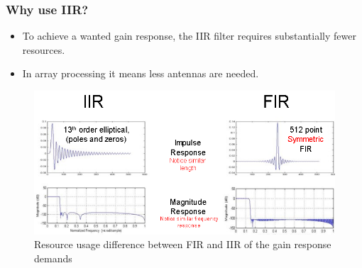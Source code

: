 \documentclass[10pt,pdflatex,headrule,landscape]{beamer}
\begin{document}
\begin{frame}
\frametitle{Why use IIR?}

\begin{itemize}
\item 
{
To achieve a wanted gain response, the IIR filter requires substantially fewer resources.
}
\item 
{
In array processing it means less antennas are needed.
}
\end{itemize}

\begin{figure}
\includegraphics[width=.8\textwidth]{Media/FIRvsIIR.PNG}
\caption{Resource usage difference between FIR and IIR of the gain response demands}
\end{figure}

\end{frame}
\end{document}
